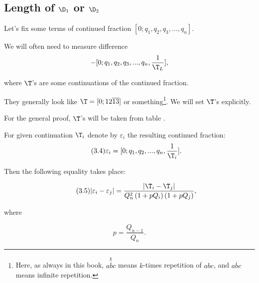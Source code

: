 \subsection{Length of $\D_1$ or $\D_2$}

Let's fix some terms of continued fraction $[0; q_1, q_2, q_3, ..., q_n]$.

We will often need to measure difference
\begin{equation*}
	[0; q_1, q_2, q_3, ..., q_n, \frac{1}{\T_R}] - 
	[0; q_1, q_2, q_3, ..., q_n, \frac{1}{\T_L}],
\end{equation*}

where $\T$'s are some continuations of the continued fraction.

They generally look like $\T = [0;12\overline{13}]$ or something\footnote{%
	Here, as always in this book, $\overset{k}{\overline{abc}}$
	means $k$-times repetition of $abc$,
	and $\overline{abc}$ means infinite repetition.}.
We will set $\T$'s explicitly.

For the general proof, $\T$'s will be taken from table .

\begin{designation}
	For given continuation $\T_i$ denote by $\varepsilon_i$ the resulting continued fraction:
	\begin{equation}\tag{3.4}\label{epsilon_rule}
		\varepsilon_i = [0; q_1, q_2, ..., q_n, \frac{1}{\T_i}].
	\end{equation}
\end{designation}

Then the following equality takes place:

\begin{equation}\tag{3.5}\label{varepsilons_difference}
	| \varepsilon_i - \varepsilon_j | = 
	\dfrac{| \T_i - \T_j |}
	{Q_n^2 \left(1 + pQ_i\right) \left(1 + pQ_j\right)},
\end{equation}

where

\begin{equation*}
	p = \dfrac{Q_{n-1}}{Q_n}.
\end{equation*}

